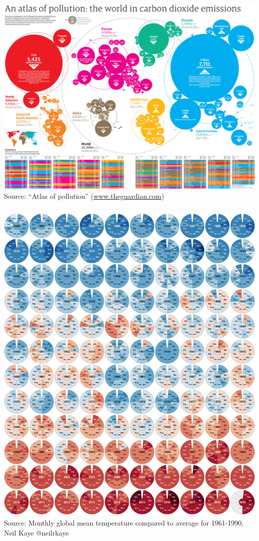 \documentclass[8pt]{beamer}
\begin{document}
\begin{frame}
\frametitle{\insertsection}
\centering
\includegraphics[width=0.85\linewidth]{atlas}\\
\tiny{Source: ``Atlas of pollution'' (\url{www.theguardian.com})}
\end{frame}


\begin{frame}
\frametitle{\insertsection}
\centering
\includegraphics[width=0.54\linewidth]{temperature}\\
\tiny{Source: Monthly global mean temperature compared to average for 1961-1990, Neil Kaye @neilrkaye}
\end{frame}

\end{document}
